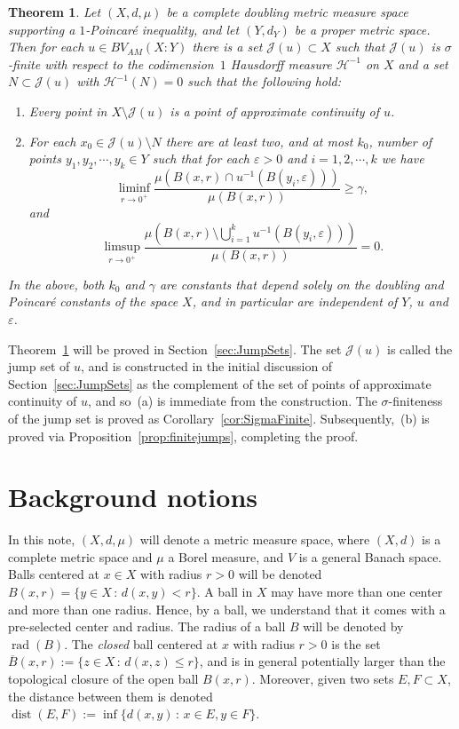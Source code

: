 \documentclass[11pt, letterpaper]{amsart} %
\newcommand*{\eps}{\varepsilon}
\DeclareMathOperator{\dist}{dist}
\DeclareMathOperator{\rad}{rad}
\numberwithin{equation}{section}
\theoremstyle{plain}
\newtheorem{theorem}[equation]{Theorem}
\theoremstyle{definition}
\begin{document}
{\begin{theorem}\label{thm:main2}
Let $(X,d,\mu)$ be a complete doubling metric measure space supporting a $1$-Poincar\'e inequality, and
let $(Y,d_Y)$ be a proper metric space. Then for each $u\in BV_{AM}(X:Y)$ there is a set $\mathcal{J}(u)\subset X$
such that $\mathcal{J}(u)$ is $\sigma$-finite with respect to the codimension~$1$ Hausdorff measure
$\mathcal{H}^{-1}$ on $X$ and a set $N\subset\mathcal{J}(u)$ with $\mathcal{H}^{-1}(N)=0$ such that
the following hold:
\begin{enumerate}
\item[(a)] Every point in $X\setminus\mathcal{J}(u)$ is a point of approximate continuity of $u$.
\item[(b)] For each $x_0\in\mathcal{J}(u)\setminus N$ there are at least two, and at most $k_0$, number of 
points $y_1,y_2,\cdots, y_k\in Y$ such that for each $\eps>0$ and $i=1, 2,\cdots, k$ we have 
\[
\liminf_{r\to 0^+}\frac{\mu(B(x,r)\cap u^{-1}(B(y_i,\eps)))}{\mu(B(x,r))}\ge \gamma,
\]
and
\[
\limsup_{r\to 0^+}\frac{\mu(B(x,r)\setminus \bigcup_{i=1}^ku^{-1}(B(y_i,\eps)))}{\mu(B(x,r))}=0.
\]
\end{enumerate}
In the above, both $k_0$ and $\gamma$ are constants that depend solely on the doubling and Poincar\'e constants of
the space $X$, and in particular are independent of $Y$, $u$ and $\eps$.
\end{theorem}

Theorem~\ref{thm:main2} will be proved in Section~\ref{sec:JumpSets}. The set $\mathcal{J}(u)$ is called the jump
set of $u$, and is constructed in the initial discussion of Section~\ref{sec:JumpSets} as the complement of the
set of points of approximate continuity of $u$, and so~(a) is immediate from the construction. The
$\sigma$-finiteness of the jump set is proved as Corollary~\ref{cor:SigmaFinite}. Subsequently,~(b) is
proved via Proposition~\ref{prop:finitejumps}, completing the proof.



\section{Background notions}\label{Sec:2}

In this note, $(X,d,\mu)$ will denote a metric measure space, where $(X,d)$ is a 
complete metric space and $\mu$ a Borel measure, and $V$ is a general Banach space. 
Balls centered at $x\in X$  with radius $r>0$ will be denoted $B(x,r)=\{y\in X\, :\, d(x,y)<r\}$.
A ball in $X$ may have more than one center and more than one radius. Hence, by a ball,
we understand that it comes with a pre-selected center and radius. The radius of a ball $B$ will
be denoted by $\rad(B)$. The \emph{closed} ball centered at $x$ with radius $r>0$ is the set
$\overline{B}(x,r):=\{z\in X\, :\, d(x,z)\le r\}$, and is in general potentially larger than the topological
closure of the open ball $B(x,r)$. Moreover, given two sets $E,F\subset X$, the distance between
them is denoted $\dist(E,F):=\inf\{d(x,y)\, :\, x\in E, y\in F\}$.

}
\end{document}

